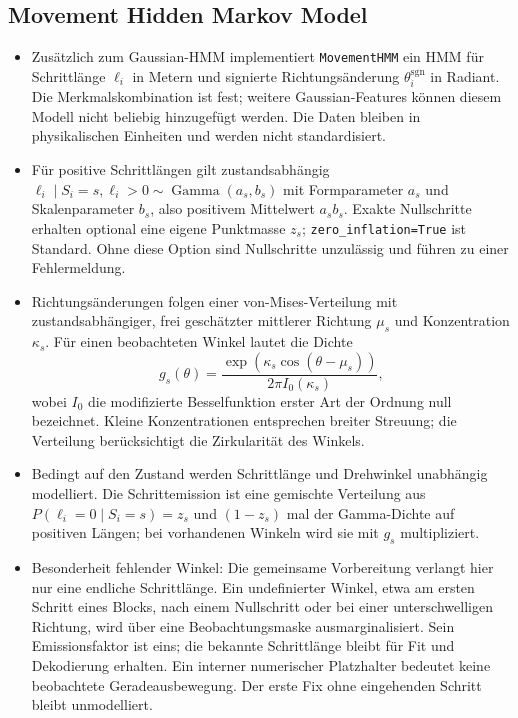 \subsection{Movement Hidden Markov Model}
\label{subsec:movement-hmm}
\begin{itemize}
    \item Zusätzlich zum Gaussian-HMM implementiert \texttt{MovementHMM} ein HMM für Schrittlänge $\ell_i$ in Metern und signierte Richtungsänderung $\theta_i^{\mathrm{sgn}}$ in Radiant. 
    Die Merkmalskombination ist fest; weitere Gaussian-Features können diesem Modell nicht beliebig hinzugefügt werden. Die Daten bleiben in physikalischen Einheiten und werden nicht standardisiert.
    \item Für positive Schrittlängen gilt zustandsabhängig $\ell_i\mid S_i=s,\ell_i>0\sim\operatorname{Gamma}(a_s,b_s)$ mit Formparameter $a_s$ und Skalenparameter $b_s$, also positivem Mittelwert $a_sb_s$. Exakte Nullschritte erhalten optional eine eigene Punktmasse $z_s$; \texttt{zero\_\allowbreak{}inflation=True} ist Standard. Ohne diese Option sind Nullschritte unzulässig und führen zu einer Fehlermeldung.
    \item Richtungsänderungen folgen einer von-Mises-Verteilung mit zustandsabhängiger, frei geschätzter mittlerer Richtung $\mu_s$ und Konzentration $\kappa_s$. Für einen beobachteten Winkel lautet die Dichte
    \[
        g_s(\theta)=\frac{\exp\!\left(\kappa_s\cos(\theta-\mu_s)\right)}{2\pi I_0(\kappa_s)},
    \]
    wobei $I_0$ die modifizierte Besselfunktion erster Art der Ordnung null bezeichnet. Kleine Konzentrationen entsprechen breiter Streuung; die Verteilung berücksichtigt die Zirkularität des Winkels.
    \item Bedingt auf den Zustand werden Schrittlänge und Drehwinkel unabhängig modelliert. Die Schrittemission ist eine gemischte Verteilung aus $P(\ell_i=0\mid S_i=s)=z_s$ und $(1-z_s)$ mal der Gamma-Dichte auf positiven Längen; bei vorhandenen Winkeln wird sie mit $g_s$ multipliziert.
    \item Besonderheit fehlender Winkel: Die gemeinsame Vorbereitung verlangt hier nur eine endliche Schrittlänge. Ein undefinierter Winkel, etwa am ersten Schritt eines Blocks, nach einem Nullschritt oder bei einer unterschwelligen Richtung, wird über eine Beobachtungsmaske ausmarginalisiert. Sein Emissionsfaktor ist eins; die bekannte Schrittlänge bleibt für Fit und Dekodierung erhalten. Ein interner numerischer Platzhalter bedeutet keine beobachtete Geradeausbewegung. Der erste Fix ohne eingehenden Schritt bleibt unmodelliert.

\end{itemize}

